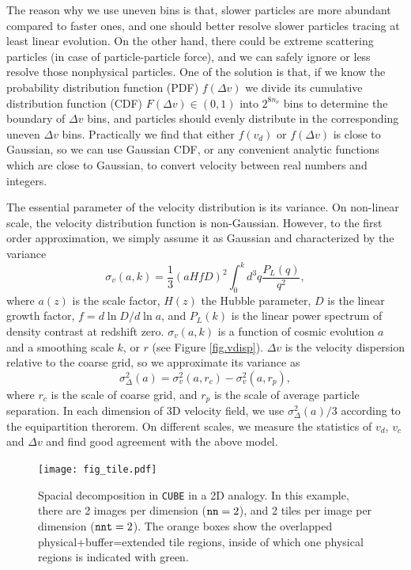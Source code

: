 \documentclass[10pt,twocolumn,preprint]{emulateapj}
\begin{document}
The reason why we use uneven bins is that, slower particles are more abundant compared to faster ones, and one should better resolve slower particles tracing at least linear evolution. On the other hand, there could be extreme scattering particles (in case of particle-particle force), and we can safely ignore or less resolve those nonphysical particles. One of the solution is that, if we know the probability distribution function (PDF) $f(\Delta v)$ we divide its cumulative distribution function (CDF) $F(\Delta v)\in(0,1)$ into $2^{8n_\nu}$ bins to determine the boundary of $\Delta v$ bins, and particles should evenly distribute in the corresponding uneven $\Delta v$ bins. Practically we find that either $f(v_d)$ or $f(\Delta v)$ is close to Gaussian, so we can use Gaussian CDF, or any convenient analytic functions which are close to Gaussian, to convert velocity between real numbers and integers.

The essential parameter of the velocity distribution is its variance. On non-linear scale, the velocity distribution function is non-Gaussian. However, to the first order approximation, we simply assume it as Gaussian and characterized by the variance
\begin{equation}\label{eq.vdisp}
	\sigma_v(a,k) = \frac{1}{3}  (a H f D)^2 \int_0^kd^3q\frac{P_{L}(q)}{q^2},
\end{equation}
where $a(z)$ is the scale factor, $H(z)$ the Hubble parameter, $D$ is the linear growth factor, $f=d \ln D/d\ln a$, and $P_L(k)$ is the linear power spectrum of density contrast at redshift zero. $\sigma_v(a,k)$ is a function of cosmic evolution $a$ and a smoothing scale $k$, or $r$ (see Figure \ref{fig.vdisp}). $\Delta v$ is the velocity dispersion relative to the coarse grid, so we approximate its variance as
\begin{equation}\label{eq.vdelta}
	\sigma^2_{\Delta}(a)=\sigma^2_v(a,r_c)-\sigma^2_v(a,r_p), 
\end{equation}
where $r_c$ is the scale of coarse grid, and $r_p$ is the scale of average particle separation. In each dimension of 3D velocity field, we use $\sigma^2_{\Delta}(a)/3$ according to the equipartition therorem. On different scales, we measure the statistics of $v_d$, $v_c$ and $\Delta v$ and find good agreement with the above model.

\begin{figure}
\centering
  \texttt{[image: fig\_tile.pdf]}
 \caption{Spacial decomposition in {\tt CUBE} in a 2D analogy. In this example, there are 2 images per dimension (${\tt nn}=2$), and 2 tiles per image per dimension (${\tt nnt}=2$). The orange boxes show the overlapped physical+buffer=extended tile regions, inside of which one physical regions is indicated with green.}
\label{fig.tile}
\end{figure}
\end{document}
